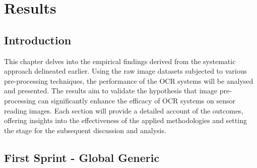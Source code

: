 \chapter{Results}
\label{chap:results}

\section{Introduction}

This chapter delves into the empirical findings derived from the systematic approach delineated earlier. Using the raw image datasets subjected to various pre-processing techniques, the performance of the OCR systems will be analysed and presented. The results aim to validate the hypothesis that image pre-processing can significantly enhance the efficacy of OCR systems on sensor reading images. Each section will provide a detailed account of the outcomes, offering insights into the effectiveness of the applied methodologies and setting the stage for the subsequent discussion and analysis.

\section{First Sprint - Global Generic}

